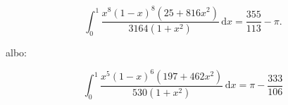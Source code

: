 \begin{problem}
\begin{equation}
    \int_0^1 \frac {x^8(1-x)^8 (25+816x^2)}{3164 (1+x^2)} \,\mathrm{d} x = \frac {355}{113} - \pi.
\end{equation}
\end{problem}

albo:

\begin{problem}
\begin{equation}
    \int_0^1 \frac{x^5 ( 1-x)^6 (197 + 462 x^2)}{530 (1+x^2)} \,\mathrm{d}x = \pi - \frac{333}{106}
\end{equation}
\end{problem}


%